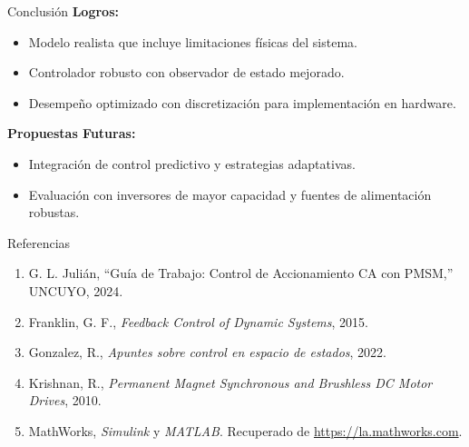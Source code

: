 \documentclass[12pt]{beamer}
\begin{document}
\begin{frame}{Conclusión}
\textbf{Logros:}
\begin{itemize}
    \item Modelo realista que incluye limitaciones físicas del sistema.
    \item Controlador robusto con observador de estado mejorado.
    \item Desempeño optimizado con discretización para implementación en hardware.
\end{itemize}

\textbf{Propuestas Futuras:}
\begin{itemize}
    \item Integración de control predictivo y estrategias adaptativas.
    \item Evaluación con inversores de mayor capacidad y fuentes de alimentación robustas.
\end{itemize}
\end{frame}

\begin{frame}{Referencias}
\begin{enumerate}
    \item G. L. Julián, “Guía de Trabajo: Control de Accionamiento CA con PMSM,” UNCUYO, 2024.
    \item Franklin, G. F., \textit{Feedback Control of Dynamic Systems}, 2015.
    \item Gonzalez, R., \textit{Apuntes sobre control en espacio de estados}, 2022.
    \item Krishnan, R., \textit{Permanent Magnet Synchronous and Brushless DC Motor Drives}, 2010.
    \item MathWorks, \textit{Simulink} y \textit{MATLAB}. Recuperado de \url{https://la.mathworks.com}.
\end{enumerate}
\end{frame}
\end{document}
